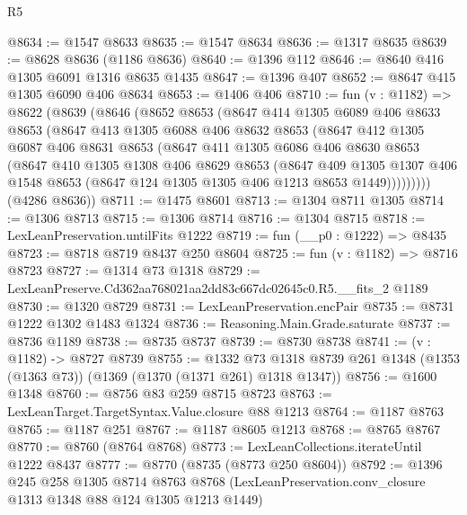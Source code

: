 \begin{lexlean}{R5}
\begin{coremodule}
@8634 := @1547 @8633
@8635 := @1547 @8634
@8636 := @1317 @8635
@8639 := @8628 @8636 (@1186 @8636)
@8640 := @1396 @112
@8646 := @8640 @416 @1305 @6091 @1316 @8635 @1435
@8647 := @1396 @407
@8652 := @8647 @415 @1305 @6090 @406 @8634
@8653 := @1406 @406
@8710 := fun (v : @1182) =>
  @8622
    (@8639
      (@8646
        (@8652
          @8653
          (@8647
            @414
            @1305
            @6089
            @406
            @8633
            @8653
            (@8647
              @413
              @1305
              @6088
              @406
              @8632
              @8653
              (@8647
                @412
                @1305
                @6087
                @406
                @8631
                @8653
                (@8647
                  @411
                  @1305
                  @6086
                  @406
                  @8630
                  @8653
                  (@8647
                    @410
                    @1305
                    @1308
                    @406
                    @8629
                    @8653
                    (@8647
                      @409
                      @1305
                      @1307
                      @406
                      @1548
                      @8653
                      (@8647 @124 @1305 @1305 @406 @1213 @8653 @1449)))))))))
      (@4286 @8636))
@8711 := @1475 @8601
@8713 := @1304 @8711 @1305
@8714 := @1306 @8713
@8715 := @1306 @8714
@8716 := @1304 @8715
@8718 := LexLeanPreservation.untilFits @1222
@8719 := fun (__p0 : @1222) => @8435
@8723 := @8718 @8719 @8437 @250 @8604
@8725 := fun (v : @1182) => @8716 @8723
@8727 := @1314 @73 @1318
@8729 := LexLeanPreserve.Cd362aa768021aa2dd83c667dc02645c0.R5.__fits_2 @1189
@8730 := @1320 @8729
@8731 := LexLeanPreservation.encPair
@8735 := @8731 @1222 @1302 @1483 @1324
@8736 := Reasoning.Main.Grade.saturate
@8737 := @8736 @1189
@8738 := @8735 @8737
@8739 := @8730 @8738
@8741 := (v : @1182) -> @8727 @8739
@8755 := @1332
    @73
    @1318
    @8739
    @261
    @1348
    (@1353 (@1363 @73))
    (@1369 (@1370 (@1371 @261) @1318 @1347))
@8756 := @1600 @1348
@8760 := @8756 @83 @259 @8715 @8723
@8763 := LexLeanTarget.TargetSyntax.Value.closure @88 @1213
@8764 := @1187 @8763
@8765 := @1187 @251
@8767 := @1187 @8605 @1213
@8768 := @8765 @8767
@8770 := @8760 (@8764 @8768)
@8773 := LexLeanCollections.iterateUntil @1222 @8437
@8777 := @8770 (@8735 (@8773 @250 @8604))
@8792 := @1396
    @245
    @258
    @1305
    @8714
    @8763
    @8768
    (LexLeanPreservation.conv_closure @1313 @1348 @88 @124 @1305 @1213 @1449)

\end{coremodule}
\end{lexlean}
